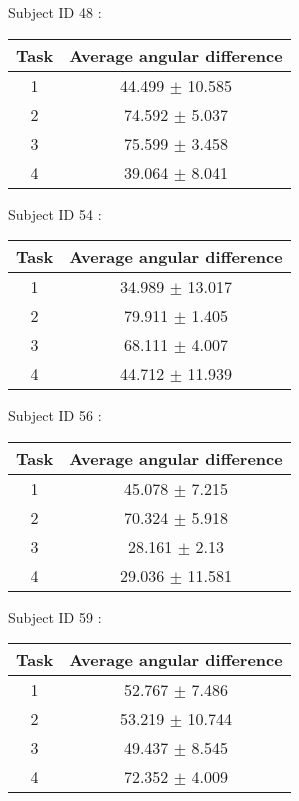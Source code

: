 \documentclass[12pt]{article}
\begin{document}
\par Subject ID  48 :
\begin{center}
\begin{tabular}{|c|c|}
\hline
 Task & Average angular difference \\ \hline
1  &  44.499 $\pm$ 10.585 \\
2  &  74.592 $\pm$ 5.037 \\
3  &  75.599 $\pm$ 3.458 \\
4  &  39.064 $\pm$ 8.041 \\
\hline
\end{tabular}
\end{center}

\par Subject ID  54 :
\begin{center}
\begin{tabular}{|c|c|}
\hline
 Task & Average angular difference \\ \hline
1  &  34.989 $\pm$ 13.017 \\
2  &  79.911 $\pm$ 1.405 \\
3  &  68.111 $\pm$ 4.007 \\
4  &  44.712 $\pm$ 11.939 \\
\hline
\end{tabular}
\end{center}

\par Subject ID  56 :
\begin{center}
\begin{tabular}{|c|c|}
\hline
 Task & Average angular difference \\ \hline
1  &  45.078 $\pm$ 7.215 \\
2  &  70.324 $\pm$ 5.918 \\
3  &  28.161 $\pm$ 2.13 \\
4  &  29.036 $\pm$ 11.581 \\
\hline
\end{tabular}
\end{center}

\par Subject ID  59 :
\begin{center}
\begin{tabular}{|c|c|}
\hline
 Task & Average angular difference \\ \hline
1  &  52.767 $\pm$ 7.486 \\
2  &  53.219 $\pm$ 10.744 \\
3  &  49.437 $\pm$ 8.545 \\
4  &  72.352 $\pm$ 4.009 \\
\hline
\end{tabular}
\end{center}
\end{document}

